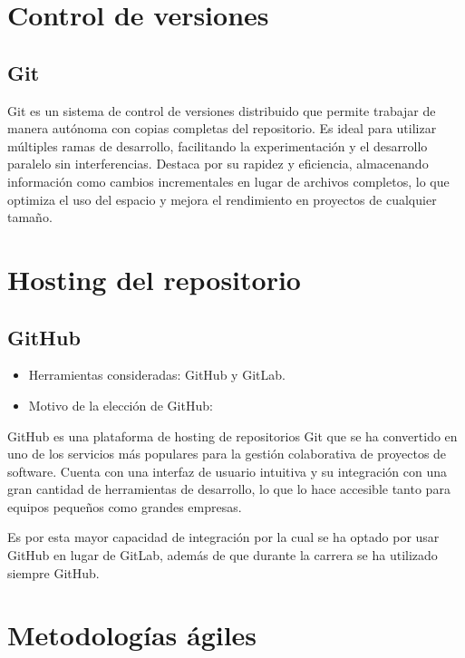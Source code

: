 
\section{Control de versiones}\label{control-de-versiones}

\subsection{Git}\label{git}

Git es un sistema de control de versiones distribuido que permite trabajar de manera autónoma con copias completas del repositorio. Es ideal para utilizar múltiples ramas de desarrollo, facilitando la experimentación y el desarrollo paralelo sin interferencias. Destaca por su rapidez y eficiencia, almacenando información como cambios incrementales en lugar de archivos completos, lo que optimiza el uso del espacio y mejora el rendimiento en proyectos de cualquier tamaño.

\section{Hosting del repositorio}\label{hosting-del-repositorio}

\subsection{GitHub}\label{github}

\begin{itemize}
    \item Herramientas consideradas: GitHub y GitLab.
    \item Motivo de la elección de GitHub:
\end{itemize}

GitHub es una plataforma de hosting de repositorios Git que se ha convertido en uno de los servicios más populares para la gestión colaborativa de proyectos de software. Cuenta con una interfaz de usuario intuitiva y su integración con una gran cantidad de herramientas de desarrollo, lo que lo hace accesible tanto para equipos pequeños como grandes empresas. 

Es por esta mayor capacidad de integración por la cual se ha optado por usar GitHub en lugar de GitLab, además de que durante la carrera se ha utilizado siempre GitHub.

\section{Metodologías ágiles}\label{metodologías-ágiles}

